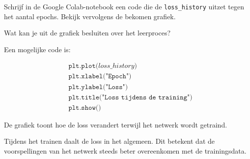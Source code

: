 \documentclass{ximera}
\begin{document}
\begin{question}
Schrijf in de Google Colab-notebook een code die de \texttt{loss\_history} uitzet tegen het aantal epochs. Bekijk vervolgens de bekomen grafiek. 

Wat kan je uit de grafiek besluiten over het leerproces?

\begin{multipleChoice}
\end{multipleChoice}

\begin{feedback} \text{ }

Een mogelijke code is:

\[
\begin{aligned}
&\texttt{plt.plot($loss\_history$)}\\
&\texttt{plt.xlabel("Epoch")}\\
&\texttt{plt.ylabel("Loss")}\\
&\texttt{plt.title("Loss tijdens de training")}\\
&\texttt{plt.show()}
\end{aligned}
\]

De grafiek toont hoe de loss verandert terwijl het netwerk wordt getraind.

Tijdens het trainen daalt de loss in het algemeen. Dit betekent dat de voorspellingen van het netwerk steeds beter overeenkomen met de trainingsdata.
\end{feedback}
\end{question}
\end{document}

